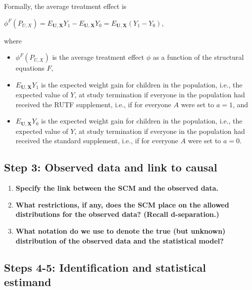 \documentclass{article}\usepackage[]{graphicx}\usepackage[]{xcolor}
\begin{document}
\begin{enumerate}[label=\textbf{\alph*.}]
    Formally, the average treatment effect is
    
    $\phi^F(P_{U,X}) = E_{\bm{U},\bm{X}}Y_1 - E_{\bm{U},\bm{X}}Y_0 = E_{\bm{U},\bm{X}}(Y_1 - Y_0)$,
    
where

    \begin{itemize}

      \item $\phi^F(P_{U,X})$ is the average treatment effect $\phi$ as a function of the structural equations $F$,
      \item $E_{\bm{U},\bm{X}}Y_1$ is the expected weight gain for children in the population, i.e., the expected value of $Y$, at study termination if everyone in the population had received the RUTF supplement, i.e., if for everyone $A$ were set to $a = 1$, and
      \item $E_{\bm{U},\bm{X}}Y_0$ is the expected weight gain for children in the population, i.e., the expected value of $Y$, at study termination if everyone in the population had received the standard supplement, i.e., if for everyone $A$ were set to $a = 0$.

    \end{itemize}

  \end{enumerate}
  
  \subsection{Step 3: Observed data and link to causal}
  
  \begin{enumerate}[label=\textbf{\alph*.}]
  
    \item \textbf{Specify the link between the SCM and the observed data.}
    
    \item \textbf{What restrictions, if any, does the SCM place on the allowed distributions for the observed data? (Recall d-separation.)}
    
    \item \textbf{What notation do we use to denote the true (but unknown) distribution of the observed data and the statistical model?}
  
  \end{enumerate}
  
  \subsection{Steps 4-5: Identification and statistical estimand}
  
\end{document}
